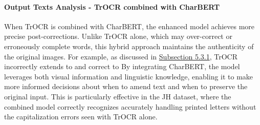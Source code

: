 
\paragraph*{Output Texts Analysis - TrOCR combined with CharBERT}
When TrOCR is combined with CharBERT, the enhanced model achieves more precise post-corrections. Unlike TrOCR alone, which may over-correct or erroneously complete words, this hybrid approach maintains the authenticity of the original images. For example, as discussed in \hyperref[subsec:5_baseline_models]{Subsection 5.3.1}, TrOCR incorrectly extends  to  and correct  to  By integrating CharBERT, the model leverages both visual information and linguistic knowledge, enabling it to make more informed decisions about when to amend text and when to preserve the original input. This is particularly effective in the JH dataset, where the combined model correctly recognizes  accurately handling printed letters without the capitalization errors seen with TrOCR alone.

